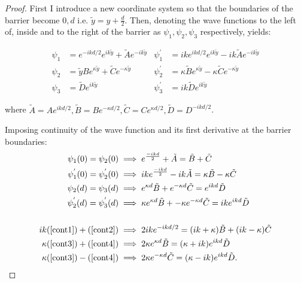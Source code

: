 \documentclass{article}
\begin{document}
\begin{proof}
	\noindent First I introduce a new coordinate system so that the boundaries of the barrier become $0,d \text{ i.e. } \tilde{y} = y+\frac{d}{2}$. Then, denoting the wave functions to the left of, inside and to the right of the barrier as $\psi_{1}, \psi_{2}, \psi_{3}$ respectively, yields:

\begin{subequations}
\begin{align}
	\psi_{1} &= e^{-ikd/2}e^{ik\tilde{y}} + \tilde{A}e^{-ik\tilde{y}} & \psi_{1}^{'} &= ike^{ikd/2}e^{ik\tilde{y}} - ik\tilde{A}e^{-ik\tilde{y}} \\
	\psi_{2} &= \tilde{y}Be^{\kappa\tilde{y}} + \tilde{C}e^{-\kappa\tilde{y}} & \psi_{2}^{'} &= \kappa\tilde{B}e^{\kappa\tilde{y}} -\kappa \tilde{C}e^{-\kappa \tilde{y}} \\
	\psi_{3} &= \tilde{D}e^{ik\tilde{y}} & \psi_{3}^{'} &= ik\tilde{D}e^{ik\tilde{y}}
\end{align}
\end{subequations}

\noindent where $\tilde{A} = Ae^{ikd/2}, \tilde{B} = Be^{-\kappa d/2}, \tilde{C} = Ce^{\kappa d/2}, \tilde{D} = D^{-ikd/2}$.

\noindent Imposing continuity of the wave function and its first derivative at the barrier boundaries:
\begin{subequations}
\begin{align}
	\psi_{1}(0) = \psi_{2}(0) &\implies e^{\frac{-ikd}{2}}+\tilde{A} = \tilde{B}+\tilde{C} \label{cont1}\\
	\psi_{1}^{'}(0) = \psi_{2}^{'}(0) &\implies ike^{\frac{-ikd}{2}} - ik\tilde{A} = \kappa \tilde{B} - \kappa \tilde{C} \label{cont2}\\
	\psi_{2}(d) = \psi_{3}(d) &\implies e^{\kappa d}\tilde{B} + e^{-\kappa d}\tilde{C} = e^{ikd}\tilde{D} \label{cont3}\\
	\psi_{2}^{'}(d) = \psi_{3}^{'}(d) &\implies \kappa e^{\kappa d}\tilde{B} + -\kappa e^{-\kappa d}\tilde{C} = ike^{ikd}\tilde{D} \label{cont4}\\
	\\
	ik(\ref{cont1})+(\ref{cont2}) &\implies 2ike^{-ikd/2} = (ik+\kappa)\tilde{B}+(ik-\kappa)\tilde{C} \label{cont5}\\
	\kappa(\ref{cont3})+(\ref{cont4}) &\implies 2\kappa e^{\kappa d}\tilde{B} = (\kappa+ik)e^{ikd}\tilde{D} \label{cont7}\\
	\kappa(\ref{cont3})-(\ref{cont4}) &\implies 2\kappa e^{-\kappa d}\tilde{C} = (\kappa-ik)e^{ikd}\tilde{D} \label{cont8}.
	\end{align}
\end{subequations}


\end{proof}
\end{document}
